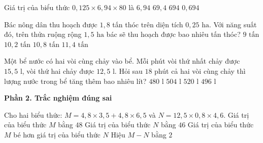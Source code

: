 \begin{ex} %
Giá trị của biểu thức $0{,}125 \times 6{,}94 \times 80$ là
\choice
{$6{,}94$}
{\True $69{,}4$}
{$694$}
{$0{,}694$}
\end{ex}

\begin{ex} %
Bác nông dân thu hoạch được $1{,}8$ tấn thóc trên diện tích $0{,}25\text{ ha}$. Với năng suất đó, trên thửa ruộng rộng $1{,}5\text{ ha}$ bác sẽ thu hoạch được bao nhiêu tấn thóc?
\choice
{$9\text{ tấn}$}
{$10{,}2\text{ tấn}$}
{\True $10{,}8\text{ tấn}$}
{$11{,}4\text{ tấn}$}
\end{ex}

\begin{ex} %
Một bể nước có hai vòi cùng chảy vào bể. Mỗi phút vòi thứ nhất chảy được $15{,}5\text{ l}$, vòi thứ hai chảy được $12{,}5\text{ l}$. Hỏi sau $18$ phút cả hai vòi cùng chảy thì lượng nước trong bể tăng thêm bao nhiêu lít?
\choice
{$480\text{ l}$}
{\True $504\text{ l}$}
{$520\text{ l}$}
{$496\text{ l}$}
\end{ex}

\textbf{Phần 2. Trắc nghiệm đúng sai}

\begin{ex} %
Cho hai biểu thức: $M = 4{,}8 \times 3{,}5 + 4{,}8 \times 6{,}5$ và $N = 12{,}5 \times 0{,}8 \times 4{,}6$.
\choiceTF
{\True Giá trị của biểu thức $M$ bằng $48$}
{\True Giá trị của biểu thức $N$ bằng $46$}
{Giá trị của biểu thức $M$ bé hơn giá trị của biểu thức $N$}
{\True Hiệu $M - N$ bằng $2$}
\end{ex}

